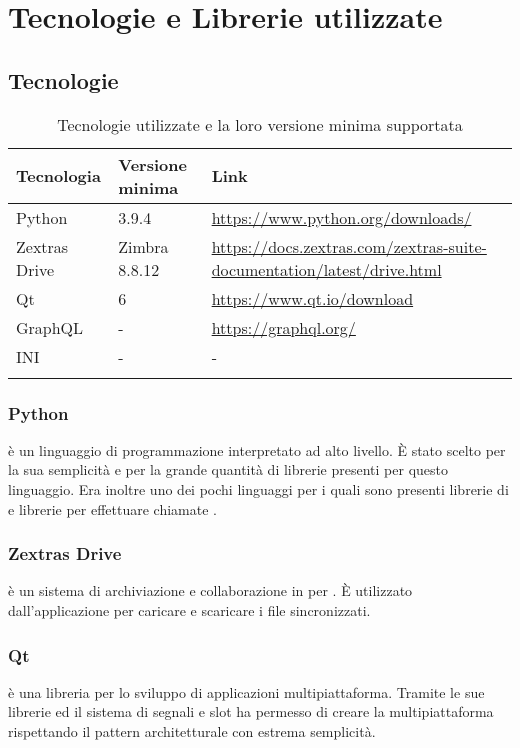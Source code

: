 \section{Tecnologie e Librerie utilizzate}
\subsection{Tecnologie}
{
	\setlength{\freewidth}{\dimexpr\textwidth-1\tabcolsep}
	\renewcommand{\arraystretch}{1.5}
	\setlength{\aboverulesep}{0pt}
	\setlength{\belowrulesep}{0pt}
	\begin{longtable}{L{.15\freewidth} L{.20\freewidth} L{.60\freewidth}}
		\textbf{Tecnologia} & \textbf{Versione minima} & \textbf{Link}\\
		\toprule
		\endhead	
		Python & 3.9.4 & \url{https://www.python.org/downloads/}\\
		Zextras Drive & Zimbra 8.8.12 &  \url{https://docs.zextras.com/zextras-suite-documentation/latest/drive.html}\\	
		Qt & 6 & \url{https://www.qt.io/download}\\
		GraphQL & - & \url{https://graphql.org/} \\
		INI & - & -\\
		\bottomrule
		\hiderowcolors
		\caption{Tecnologie utilizzate e la loro versione minima supportata}
	\end{longtable}
}
\subsubsection{Python}
 è un linguaggio di programmazione interpretato ad alto livello. È stato scelto per la sua semplicità e per la grande quantità di librerie presenti per questo linguaggio. Era inoltre uno dei pochi linguaggi per i quali sono presenti librerie di  e librerie per effettuare chiamate .
\subsubsection{Zextras Drive}
 è un sistema di archiviazione e collaborazione in  per . È utilizzato dall'applicazione per caricare e scaricare i file sincronizzati.
\subsubsection{Qt}
 è una libreria per lo sviluppo di applicazioni multipiattaforma. Tramite le sue librerie ed il sistema di segnali e slot ha permesso di creare la  multipiattaforma rispettando il pattern architetturale  con estrema semplicità.
